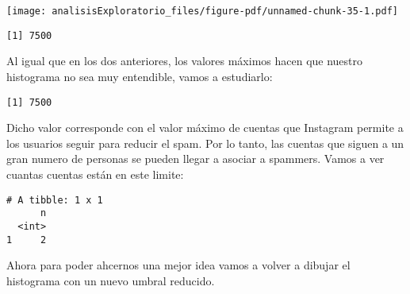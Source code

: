 \documentclass[
  letterpaper,
  DIV=11,
  numbers=noendperiod]{scrreprt}
\newenvironment{Shaded}{\begin{snugshade}}{\end{snugshade}}
\newcommand{\AttributeTok}[1]{\textcolor[rgb]{0.40,0.45,0.13}{#1}}
\newcommand{\DecValTok}[1]{\textcolor[rgb]{0.68,0.00,0.00}{#1}}
\newcommand{\FunctionTok}[1]{\textcolor[rgb]{0.28,0.35,0.67}{#1}}
\newcommand{\NormalTok}[1]{\textcolor[rgb]{0.00,0.23,0.31}{#1}}
\newcommand{\SpecialCharTok}[1]{\textcolor[rgb]{0.37,0.37,0.37}{#1}}
\newcommand{\StringTok}[1]{\textcolor[rgb]{0.13,0.47,0.30}{#1}}
\begin{document}
\texttt{[image: analisisExploratorio\_files/figure-pdf/unnamed-chunk-35-1.pdf]}

\begin{Shaded}
\end{Shaded}

\begin{verbatim}
[1] 7500
\end{verbatim}

Al igual que en los dos anteriores, los valores máximos hacen que
nuestro histograma no sea muy entendible, vamos a estudiarlo:

\begin{Shaded}
\end{Shaded}

\begin{verbatim}
[1] 7500
\end{verbatim}

Dicho valor corresponde con el valor máximo de cuentas que Instagram
permite a los usuarios seguir para reducir el spam. Por lo tanto, las
cuentas que siguen a un gran numero de personas se pueden llegar a
asociar a spammers. Vamos a ver cuantas cuentas están en este limite:

\begin{Shaded}
\end{Shaded}

\begin{verbatim}
# A tibble: 1 x 1
      n
  <int>
1     2
\end{verbatim}

Ahora para poder ahcernos una mejor idea vamos a volver a dibujar el
histograma con un nuevo umbral reducido.
\end{document}
